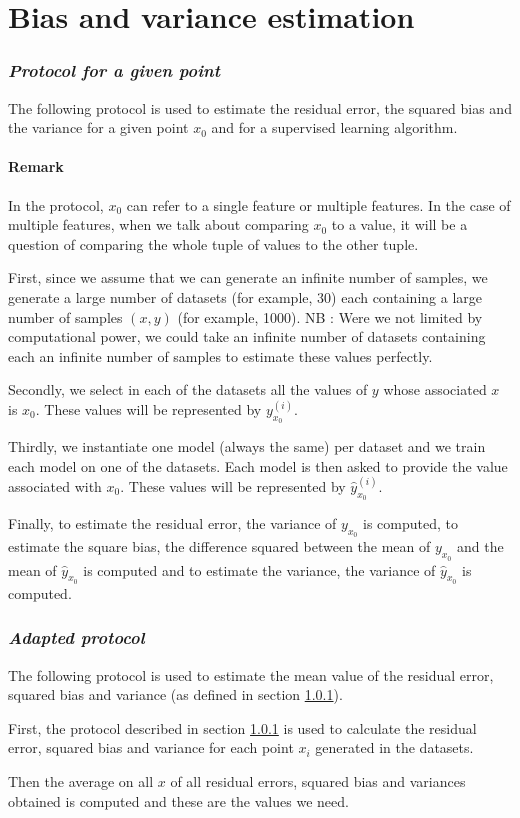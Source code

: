 \section{Bias and variance estimation}

\subsubsection{{\it Protocol for a given point}}\label{Q3.a}
The following protocol is used to estimate the residual error, the squared bias and the variance for a given point $x_0$ and for a supervised learning algorithm.\par
\paragraph{Remark} In the protocol, $x_0$ can refer to a single feature or multiple features. In the case of multiple features, when we talk about comparing $x_0$ to a value, it will be a question of comparing the whole tuple of values to the other tuple.\par
First, since we assume that we can generate an infinite number of samples, we generate a large number of datasets (for example, \num{30}) each containing a large number of samples $(x, y)$ (for example, \num{1000}).\newline
NB : Were we not limited by computational power, we could take an infinite number of datasets containing each an infinite number of samples to estimate these values perfectly.\par
Secondly, we select in each of the datasets all the values of $y$ whose associated $x$ is $x_0$. These values will be represented by $y_{x_0}^{(i)}$.\par
Thirdly, we instantiate one model (always the same) per dataset and we train each model on one of the datasets. Each model is then asked to provide the value associated with $x_0$. These values will be represented by $\hat{y}_{x_0}^{(i)}$.\par
Finally, to estimate the residual error, the variance of $y_{x_0}$ is computed, to estimate the square bias, the difference squared between the mean of $y_{x_0}$ and the mean of $\hat{y}_{x_0}$ is computed and to estimate the variance, the variance of $\hat{y}_{x_0}$ is computed.

\subsubsection{{\it Adapted protocol}}\label{Q3.b}
The following protocol is used to estimate the mean value of the residual error, squared bias and variance (as defined in section \ref{Q3.a}).\par
First, the protocol described in section \ref{Q3.a} is used to calculate the residual error, squared bias and variance for each point $x_i$ generated in the datasets.\par
Then the average on all $x$ of all residual errors, squared bias and variances obtained is computed and these are the values we need.

